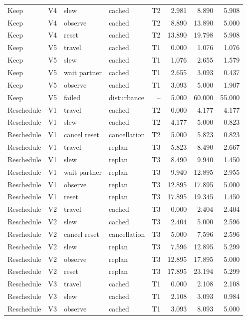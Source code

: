 \begin{longtable}{@{}lcllrrrr@{}}
Keep & V4 & slew & cached & T2 & 2.981 & 8.890 & 5.908\\
Keep & V4 & observe & cached & T2 & 8.890 & 13.890 & 5.000\\
Keep & V4 & reset & cached & T2 & 13.890 & 19.798 & 5.908\\
Keep & V5 & travel & cached & T1 & 0.000 & 1.076 & 1.076\\
Keep & V5 & slew & cached & T1 & 1.076 & 2.655 & 1.579\\
Keep & V5 & wait partner & cached & T1 & 2.655 & 3.093 & 0.437\\
Keep & V5 & observe & cached & T1 & 3.093 & 5.000 & 1.907\\
Keep & V5 & failed & disturbance & -- & 5.000 & 60.000 & 55.000\\
Reschedule & V1 & travel & cached & T2 & 0.000 & 4.177 & 4.177\\
Reschedule & V1 & slew & cached & T2 & 4.177 & 5.000 & 0.823\\
Reschedule & V1 & cancel reset & cancellation & T2 & 5.000 & 5.823 & 0.823\\
Reschedule & V1 & travel & replan & T3 & 5.823 & 8.490 & 2.667\\
Reschedule & V1 & slew & replan & T3 & 8.490 & 9.940 & 1.450\\
Reschedule & V1 & wait partner & replan & T3 & 9.940 & 12.895 & 2.955\\
Reschedule & V1 & observe & replan & T3 & 12.895 & 17.895 & 5.000\\
Reschedule & V1 & reset & replan & T3 & 17.895 & 19.345 & 1.450\\
Reschedule & V2 & travel & cached & T3 & 0.000 & 2.404 & 2.404\\
Reschedule & V2 & slew & cached & T3 & 2.404 & 5.000 & 2.596\\
Reschedule & V2 & cancel reset & cancellation & T3 & 5.000 & 7.596 & 2.596\\
Reschedule & V2 & slew & replan & T3 & 7.596 & 12.895 & 5.299\\
Reschedule & V2 & observe & replan & T3 & 12.895 & 17.895 & 5.000\\
Reschedule & V2 & reset & replan & T3 & 17.895 & 23.194 & 5.299\\
Reschedule & V3 & travel & cached & T1 & 0.000 & 2.108 & 2.108\\
Reschedule & V3 & slew & cached & T1 & 2.108 & 3.093 & 0.984\\
Reschedule & V3 & observe & cached & T1 & 3.093 & 8.093 & 5.000\\

\end{longtable}
